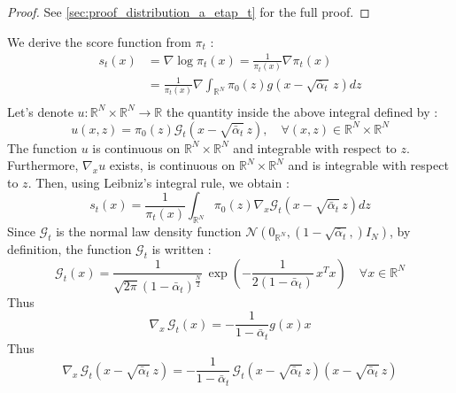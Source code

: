 \documentclass[a4paper,10pt]{article}
\theoremstyle{definition} %
\theoremstyle{definition} %
\theoremstyle{definition} %
\theoremstyle{definition} %
\newcommand{\R}{\mathbb{R}}
\newcommand{\0}{\boldsymbol{0}}
\begin{document}
\begin{proof}
    See \cref{sec:proof_distribution_a_etap_t} for the full proof.
\end{proof}
We derive the score function from $\pi_t$ :
\begin{align*}
        s_t(x) &= \nabla \log \pi_t(x) = \frac{1}{\pi_t(x)}\nabla\pi_t(x) \\
        &= \frac{1}{\pi_t(x)}\nabla\int_{\R^N} \pi_0(z) g(x - \sqrt{\bar \alpha_t} \,z) dz\\
\end{align*}
Let's denote $u: \R^N \times \R^N \rightarrow \R$ the quantity inside the above integral defined by :
\[u(x,z) =  \pi_0(z) \mathcal{G}_t(x - \sqrt{\bar \alpha_t}\,z), \quad \forall (x,z) \in \R^N \times \R^N\]
The function $u$ is continuous on $\R^N \times \R^N$ and integrable with respect to $z$. Furthermore, $\nabla_x u$ exists, is continuous on $\R^N \times \R^N$ and is integrable with respect to $z$. Then, using Leibniz's integral rule, we obtain :
\begin{equation}\label{eq:score_formule_premilinaire}
    s_t(x) = \frac{1}{\pi_t(x)} \int_{\R^N} \pi_0(z) \nabla_x \mathcal{G}_t(x - \sqrt{\bar \alpha_t} \,z) dz 
\end{equation}
Since $\mathcal{G}_t$ is the normal law density function $\mathcal{N}\left(0_{\R^N}, (1-\sqrt{\bar \alpha _t},)I_N\right)$, by definition, the function $\mathcal{G}_t$ is written :
\begin{equation*}
    \mathcal{G}_t(x) = \frac{1}{\sqrt{2\pi}(1-\bar \alpha_t)^{\frac{N}{2}}} \, \exp\left(-\frac{1}{2(1-\bar \alpha _t)}\,x^Tx\right) \quad \forall x \in \R^N
\end{equation*}
Thus
\begin{equation*}
    \nabla_x \,\mathcal{G}_t(x) = -\frac{1}{1-\bar \alpha_t}g(x)x
\end{equation*}
Thus
\begin{equation*}
    \nabla_x \,\mathcal{G}_t(x - \sqrt{\bar \alpha_t} \,z) = -\frac{1}{1-\bar \alpha_t}\,\mathcal{G}_t(x - \sqrt{\bar \alpha_t} \,z)(x - \sqrt{\bar \alpha_t} \,z)
\end{equation*}
\end{document}
